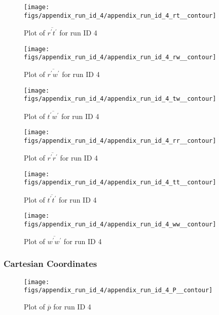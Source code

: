 \begin{figure}[H]
\centering
\texttt{[image: figs/appendix\_run\_id\_4/appendix\_run\_id\_4\_rt\_\_contour]}
\caption{Plot of $\overline{r^\prime t^\prime}$ for run ID 4}
\label{fig:appendix_run_id_4_rt__contour}
\end{figure}


\begin{figure}[H]
\centering
\texttt{[image: figs/appendix\_run\_id\_4/appendix\_run\_id\_4\_rw\_\_contour]}
\caption{Plot of $\overline{r^\prime w^\prime}$ for run ID 4}
\label{fig:appendix_run_id_4_rw__contour}
\end{figure}


\begin{figure}[H]
\centering
\texttt{[image: figs/appendix\_run\_id\_4/appendix\_run\_id\_4\_tw\_\_contour]}
\caption{Plot of $\overline{t^\prime w^\prime}$ for run ID 4}
\label{fig:appendix_run_id_4_tw__contour}
\end{figure}


\begin{figure}[H]
\centering
\texttt{[image: figs/appendix\_run\_id\_4/appendix\_run\_id\_4\_rr\_\_contour]}
\caption{Plot of $\overline{r^\prime r^\prime}$ for run ID 4}
\label{fig:appendix_run_id_4_rr__contour}
\end{figure}


\begin{figure}[H]
\centering
\texttt{[image: figs/appendix\_run\_id\_4/appendix\_run\_id\_4\_tt\_\_contour]}
\caption{Plot of $\overline{t^\prime t^\prime}$ for run ID 4}
\label{fig:appendix_run_id_4_tt__contour}
\end{figure}


\begin{figure}[H]
\centering
\texttt{[image: figs/appendix\_run\_id\_4/appendix\_run\_id\_4\_ww\_\_contour]}
\caption{Plot of $\overline{w^\prime w^\prime}$ for run ID 4}
\label{fig:appendix_run_id_4_ww__contour}
\end{figure}


\subsubsection{Cartesian Coordinates}
\begin{figure}[H]
\centering
\texttt{[image: figs/appendix\_run\_id\_4/appendix\_run\_id\_4\_P\_\_contour]}
\caption{Plot of $\overline{p}$ for run ID 4}
\label{fig:appendix_run_id_4_P__contour}
\end{figure}


